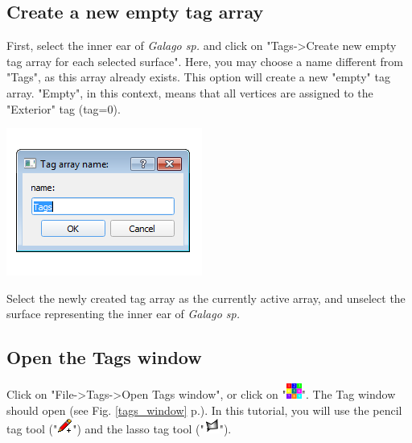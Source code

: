 \documentclass[12pt, a4paper]{book}
\begin{document}
\subsection{Create a new empty tag array}\label{empty_tag_array}

\begin{minipage}{0.5\textwidth}
First, select the inner ear of \textit{Galago sp.} and click on "Tags->Create new empty tag array for each selected surface". Here, you may choose a name different from "Tags", as this array already exists. This option will create a new "empty" tag array. "Empty", in this context, means that all vertices are assigned to the "Exterior" tag (tag=0).\end{minipage} 
\begin{minipage}{0.5\textwidth}\centering
  \includegraphics[scale=0.5]{../images/12/empty_tag_array.png}
 \end{minipage} 

Select the newly created tag array as the currently active array, and unselect the surface representing the inner ear of \textit{Galago sp.}


\subsection{Open the Tags window}
Click on "File->Tags->Open Tags window", or click on "\includegraphics[scale=0.7]{../images/04/tag_edit.png}". The Tag window should open (see Fig. \ref{tags_window} p.\pageref{tags_window}). In this tutorial, you will use the pencil tag tool ("\includegraphics[scale=0.7]{../images/12/pencil.png}") and the lasso tag tool ("\includegraphics[scale=0.7]{../images/12/lasso.png}"). 
\end{document}
